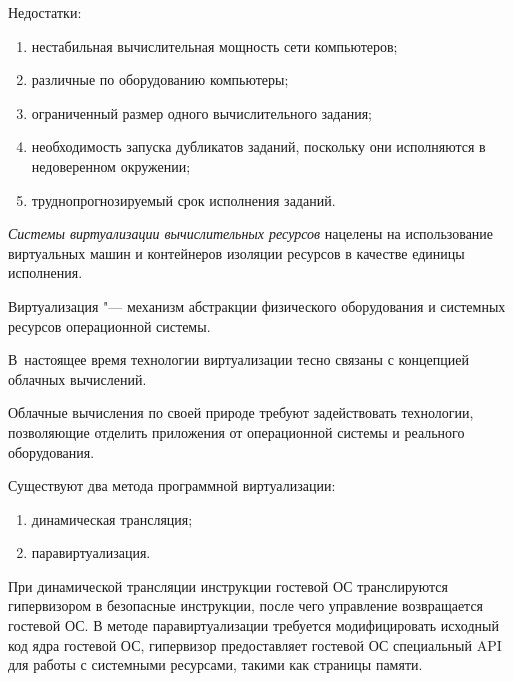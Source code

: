 Недостатки:

\begin{enumerate}

\item нестабильная вычислительная мощность сети компьютеров;

\item различные по оборудованию компьютеры;

\item ограниченный размер одного вычислительного задания;

\item необходимость запуска дубликатов заданий, поскольку они исполняются в недоверенном окружении;

\item труднопрогнозируемый срок исполнения заданий.

\end{enumerate}



\smallskip \textit{Системы виртуализации вычислительных ресурсов} нацелены на использование виртуальных машин и контейнеров изоляции ресурсов в качестве единицы исполнения. 

Виртуализация "--- механизм абстракции физического оборудования и системных ресурсов операционной системы. 

В~настоящее время технологии виртуализации тесно связаны с концепцией облачных вычислений.  

Облачные вычисления по своей природе требуют задействовать технологии, позволяющие отделить приложения от операционной системы и реального оборудования. 

Существуют два метода программной виртуализации:

\begin{enumerate}

\item динамическая трансляция;

\item паравиртуализация.

\end{enumerate}



При динамической трансляции инструкции гостевой ОС транслируются гипервизором в безопасные инструкции, после чего управление возвращается гостевой ОС. В методе паравиртуализации требуется модифицировать исходный код ядра гостевой ОС, гипервизор предоставляет гостевой ОС специальный API для работы с системными ресурсами, такими как страницы памяти.



